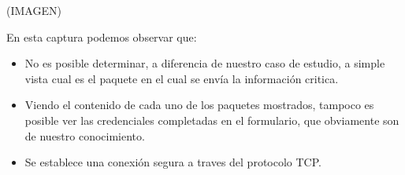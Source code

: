 (IMAGEN)

En esta captura podemos observar que:
\begin{itemize}
   \item No es posible determinar, a diferencia de nuestro caso de 
   estudio, a simple vista cual es el paquete 
   en el cual se envía la información critica.
   \item Viendo el contenido de cada uno de los paquetes mostrados,
   tampoco es posible ver las credenciales completadas en el formulario, 
   que obviamente son de nuestro conocimiento.
   \item Se establece una conexión segura a traves del protocolo TCP.
\end{itemize}


